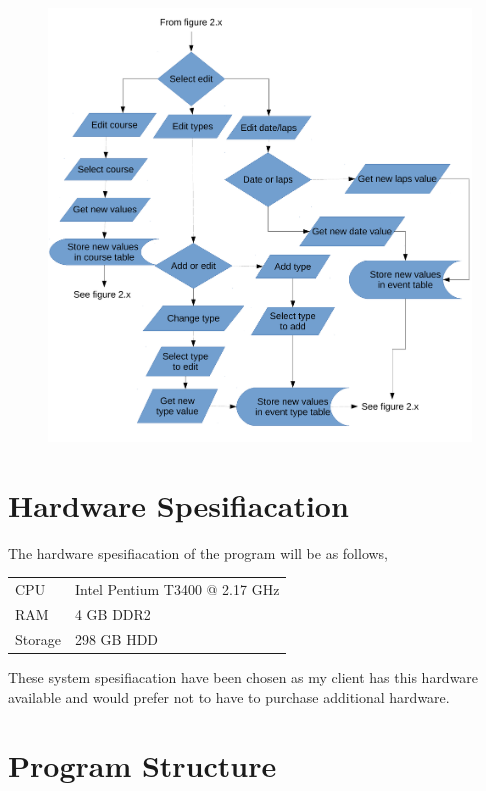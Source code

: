 \begin{figure}[H]
	\includegraphics[width=\textwidth]{./FlowChart/SectionFive.pdf}
	\caption{} \label{fig:} 	
\end{figure}

\section{Hardware Spesifiacation}

The hardware spesifiacation of the program will be as follows,

\begin{tabular}{ll}
CPU & Intel Pentium T3400 @ 2.17 GHz\\
RAM & 4 GB DDR2 \\
Storage & 298 GB HDD \\
\end{tabular}

These system spesifiacation have been chosen as my client has this hardware available and would prefer not to have to purchase additional hardware.

\section{Program Structure}

